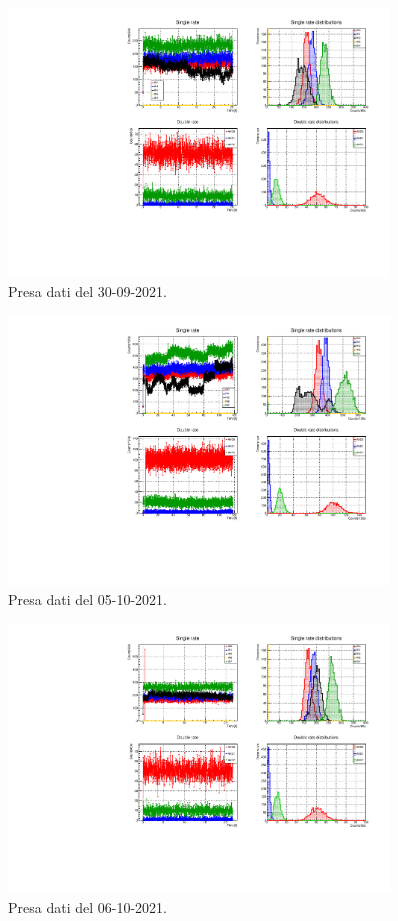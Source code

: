 \documentclass[11pt,a4paper]{article}
\begin{document}
    \begin{figure}
        \includegraphics[width=0.9\textwidth]{Immagini/20210930}
        \caption{Presa dati del 30-09-2021.}
    \end{figure}

    \begin{figure}
        \includegraphics[width=0.9\textwidth]{Immagini/20211005}
        \caption{Presa dati del 05-10-2021.}
    \end{figure}

    \begin{figure}
        \includegraphics[width=0.9\textwidth]{Immagini/20211006}
        \caption{Presa dati del 06-10-2021.}
    \end{figure}
\end{document}
